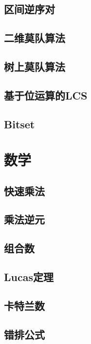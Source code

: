 \documentclass{article}
\begin{document}
\subsection{区间逆序对} 

\subsection{二维莫队算法} 

\subsection{树上莫队算法} 

\subsection{基于位运算的LCS} 

\subsection{Bitset} 



\newpage %
\section{数学} %
\subsection{快速乘法} 


\subsection{乘法逆元} 

\subsection{组合数} 

\subsection{Lucas定理} 

\subsection{卡特兰数} 

\subsection{错排公式} 

\end{document}

